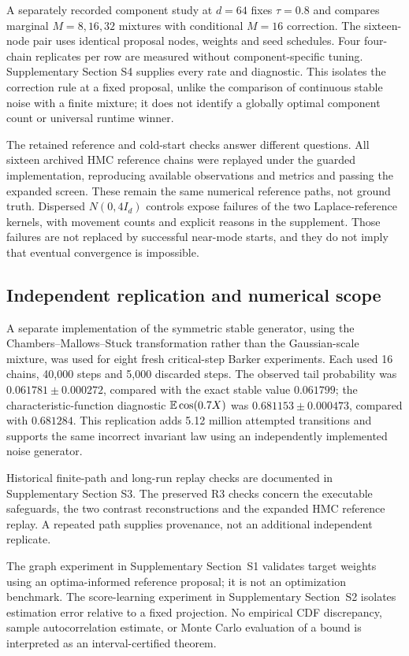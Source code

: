 \documentclass[pdflatex,iicol,sn-mathphys-ay]{sn-jnl}
\theoremstyle{definition}\newtheorem{definition}[theorem]{Definition}
\theoremstyle{remark}\newtheorem{remark}[theorem]{Remark}
\numberwithin{equation}{section}
\newcommand{\1}{\mathbf 1}
\begin{document}
A separately recorded component study at $d=64$ fixes $\tau=0.8$ and compares marginal $M=8,16,32$ mixtures with conditional $M=16$ correction. The sixteen-node pair uses identical proposal nodes, weights and seed schedules. Four four-chain replicates per row are measured without component-specific tuning. Supplementary Section S4 supplies every rate and diagnostic. This isolates the correction rule at a fixed proposal, unlike the comparison of continuous stable noise with a finite mixture; it does not identify a globally optimal component count or universal runtime winner.

The retained reference and cold-start checks answer different questions. All sixteen archived HMC reference chains were replayed under the guarded implementation, reproducing available observations and metrics and passing the expanded screen. These remain the same numerical reference paths, not ground truth. Dispersed $N(0,4I_d)$ controls expose failures of the two Laplace-reference kernels, with movement counts and explicit reasons in the supplement. Those failures are not replaced by successful near-mode starts, and they do not imply that eventual convergence is impossible.

\subsection{Independent replication and numerical scope}\label{sec:replication}
A separate implementation of the symmetric stable generator, using the Chambers--Mallows--Stuck transformation \citep{cms} rather than the Gaussian-scale mixture, was used for eight fresh critical-step Barker experiments. Each used 16 chains, 40,000 steps and 5,000 discarded steps. The observed tail probability was $0.061781\pm0.000272$, compared with the exact stable value $0.061799$; the characteristic-function diagnostic $\mathbb E\cos(0.7X)$ was $0.681153\pm0.000473$, compared with $0.681284$. This replication adds 5.12 million attempted transitions and supports the same incorrect invariant law using an independently implemented noise generator.

Historical finite-path and long-run replay checks are documented in Supplementary Section S3. The preserved R3 checks concern the executable safeguards, the two contrast reconstructions and the expanded HMC reference replay. A repeated path supplies provenance, not an additional independent replicate.

The graph experiment in Supplementary Section~S1 validates target weights using an optima-informed reference proposal; it is not an optimization benchmark. The score-learning experiment in Supplementary Section~S2 isolates estimation error relative to a fixed projection. No empirical CDF discrepancy, sample autocorrelation estimate, or Monte Carlo evaluation of a bound is interpreted as an interval-certified theorem.
\end{document}
